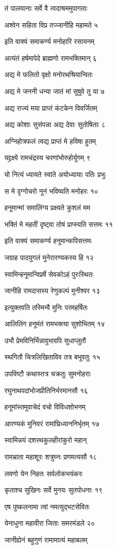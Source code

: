 तं पालयानाः सर्वे वै त्वदाश्रममुपागताः

अश्वेन सहिता विप्र तज्जानीहि महामते ५

इति वाक्यं समाकर्ण्य मनोहारि रसायनम्

अत्यंतं हर्षमापेदे ब्राह्मणो रामभक्तिमान् ६

अद्य मे फलितो वृक्षो मनोरथश्रियान्वितः

अद्य मे जननी धन्या जातं मां सुषुवे तु या ७

अद्य राज्यं मया प्राप्तं कंटकेन विवर्जितम्

अद्य कोशाः सुसंपन्ना अद्य देवाः सुतोषिताः ८

अग्निहोत्रफलं त्वद्य प्राप्तं मे हविषा हुतम्

यद्द्रक्ष्ये रामचंद्रस्य चरणांभोरुहोर्युगम् ९

यो नित्यं ध्यायते स्वांते अयोध्यायाः पतिः प्रभुः

स मे दृग्गोचरो नूनं भविष्यति मनोहरः १०

हनूमान्मां समालिंग्य प्रक्ष्यते कुशलं मम

भक्तिं मे महतीं दृष्ट्वा तोषं प्राप्स्यति सत्तमः ११

इति वाक्यं समाकर्ण्य हनूमान्कपिसत्तमः

जग्राह पादयुगलं मुनेरारण्यकस्य हि १२

स्वामिन्हनूमान्विप्रर्षे सेवकोऽहं पुरःस्थितः

जानीहि रामदासस्य रेणुकल्पं मुनीश्वर १३

इत्युक्तवति तस्मिन्वै मुनिः परमहर्षितः

आलिलिंग हनूमंतं रामभक्त्या सुशोभितम् १४

उभौ प्रेमविनिर्भिन्नावुभावपि सुधाप्लुतौ

स्थगितौ चित्रलिखिताविव तत्र बभूवतुः १५

उपविष्टौ कथास्तत्र चक्रतुः सुमनोहराः

रघुनाथपदांभोजप्रीतिनिर्भरमानसौ १६

हनूमांस्तमुवाचेदं वचो विविधशोभनम्

आरण्यकं मुनिवरं रामांघ्रिध्याननिर्भृतम् १७

स्वामिन्नयं दशरथकुलहीरांकुरो महान्

रामभ्राता महाशूरः शत्रुघ्नः प्रणमत्यसौ १८

लवणो येन निहतः सर्वलोकभयंकरः

कृताश्च सुखिनः सर्वे मुनयः सुतपोधनाः १९

एष पुष्कलनामा त्वां नमत्युद्भटसेवितः

येनाधुना महावीरा जिताः समरमंडले २०

जानीह्येनं बहुगुणं रामामात्यं महाबलम्

